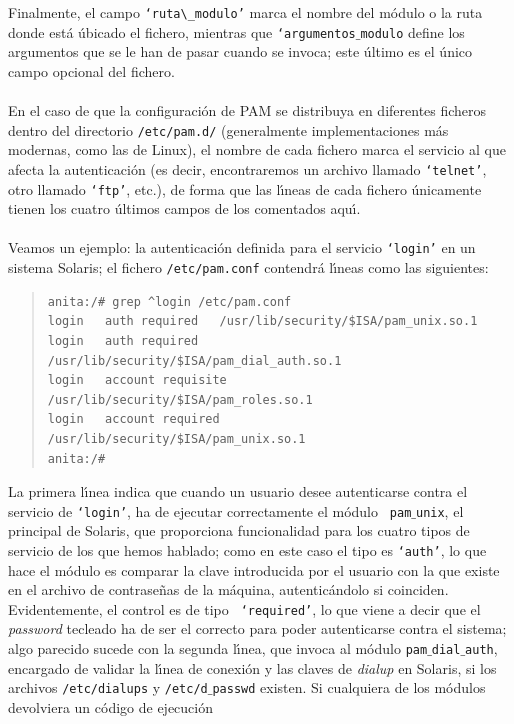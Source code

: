 Finalmente, el campo {\tt `ruta$\_$modulo'} marca el nombre del m\'odulo o la 
ruta donde est\'a \'ubicado el fichero, mientras que {\tt `argumentos$\_$modulo}
define los argumentos que se le han de pasar cuando se invoca; este \'ultimo
es el \'unico campo opcional del fichero.\\
\\En el caso de que la configuraci\'on de PAM se distribuya en diferentes 
ficheros dentro del directorio {\tt /etc/pam.d/} (generalmente implementaciones
m\'as modernas, como las de Linux), el nombre de cada fichero marca el servicio
al que afecta la autenticaci\'on (es decir, encontraremos un archivo llamado
{\tt `telnet'}, otro llamado {\tt `ftp'}, etc.), de forma que las l\'{\i}neas 
de cada fichero \'unicamente tienen los cuatro \'ultimos campos de los 
comentados aqu\'{\i}.\\
\\Veamos un ejemplo: la autenticaci\'on definida para el servicio {\tt `login'} 
en un sistema Solaris; el fichero {\tt /etc/pam.conf} contendr\'a l\'{\i}neas 
como las siguientes:
\begin{quote}
\begin{verbatim}
anita:/# grep ^login /etc/pam.conf
login   auth required   /usr/lib/security/$ISA/pam_unix.so.1 
login   auth required   /usr/lib/security/$ISA/pam_dial_auth.so.1 
login   account requisite       /usr/lib/security/$ISA/pam_roles.so.1 
login   account required        /usr/lib/security/$ISA/pam_unix.so.1 
anita:/# 
\end{verbatim}
\end{quote}
La primera l\'{\i}nea indica que cuando un usuario desee autenticarse contra
el servicio de {\tt `login'}, ha de ejecutar correctamente el m\'odulo {\tt
pam$\_$unix}, el principal de Solaris, que proporciona funcionalidad para
los cuatro tipos de servicio de los que hemos hablado; como en este caso el
tipo es {\tt `auth'}, lo que hace el m\'odulo es comparar la clave introducida
por el usuario con la que existe en el archivo de contrase\~nas de la m\'aquina,
autentic\'andolo si coinciden. Evidentemente, el control es de tipo {\tt 
`required'}, lo que viene a decir que el {\it password} tecleado ha de ser el
correcto para poder autenticarse contra el sistema; algo parecido sucede con la
segunda l\'{\i}nea, que invoca al m\'odulo {\tt pam$\_$dial$\_$auth},
encargado de validar la l\'{\i}nea de conexi\'on y las claves de {\it dialup}
en Solaris, si los archivos {\tt /etc/dialups} y {\tt /etc/d$\_$passwd} existen.
Si cualquiera de los m\'odulos devolviera un c\'odigo de ejecuci\'on 
